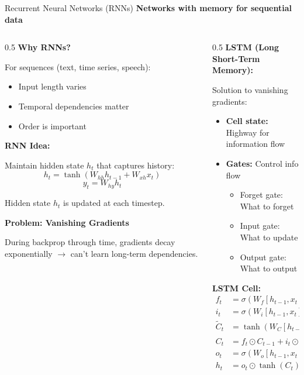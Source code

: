\begin{frame}{Recurrent Neural Networks (RNNs)}
\textbf{Networks with memory for sequential data}

\begin{columns}
\begin{column}{0.5\textwidth}
\textbf{Why RNNs?}

For sequences (text, time series, speech):
\begin{itemize}
\item Input length varies
\item Temporal dependencies matter
\item Order is important
\end{itemize}

\textbf{RNN Idea:}

Maintain hidden state $h_t$ that captures history:
\[
h_t = \tanh(W_{hh} h_{t-1} + W_{xh} x_t)
\]
\[
y_t = W_{hy} h_t
\]

Hidden state $h_t$ is updated at each timestep.

\vspace{0.3cm}

\textbf{Problem: Vanishing Gradients}

During backprop through time, gradients decay exponentially $\to$ can't learn long-term dependencies.
\end{column}

\begin{column}{0.5\textwidth}
\textbf{LSTM (Long Short-Term Memory):}

Solution to vanishing gradients:

\begin{itemize}
\item \textbf{Cell state:} Highway for information flow
\item \textbf{Gates:} Control info flow
  \begin{itemize}
  \item Forget gate: What to forget
  \item Input gate: What to update
  \item Output gate: What to output
  \end{itemize}
\end{itemize}

\vspace{0.2cm}

\textbf{LSTM Cell:}
\begin{align*}
f_t &= \sigma(W_f [h_{t-1}, x_t]) \quad \text{(forget)} \\
i_t &= \sigma(W_i [h_{t-1}, x_t]) \quad \text{(input)} \\
\tilde{C}_t &= \tanh(W_C [h_{t-1}, x_t]) \\
C_t &= f_t \odot C_{t-1} + i_t \odot \tilde{C}_t \\
o_t &= \sigma(W_o [h_{t-1}, x_t]) \quad \text{(output)} \\
h_t &= o_t \odot \tanh(C_t)
\end{align*}


\end{column}
\end{columns}
\end{frame}
